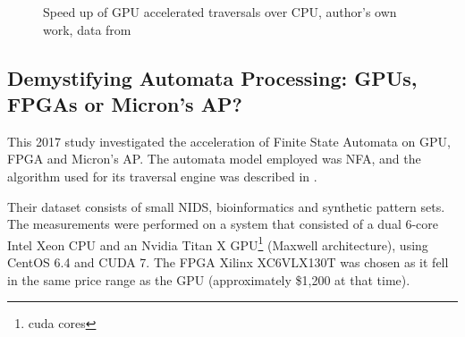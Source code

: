 \documentclass[10pt,onecolumn,twoside,english,a4paper]{article}
\begin{document}
\begin{figure}[h!]
  \centering
  \caption{Speed up of GPU accelerated traversals over CPU, author's own work, data from \cite{Becchi:regex_large_dataset}}
  \label{speedup:becchi}
\end{figure}

\subsection{Demystifying Automata Processing: GPUs, FPGAs or Micron's AP?} \label{Nourian:DemystifyingFSA_analysis}
This 2017 study\cite{Nourian:DemystifyingFSA} investigated the acceleration of Finite State Automata on GPU, FPGA and Micron's AP. The automata model employed was NFA, and the algorithm used for its traversal engine was described in \cite{van2012designing}.

Their dataset consists of small NIDS, bioinformatics and synthetic pattern sets.
The measurements were performed on a system that consisted of a dual 6-core Intel Xeon CPU and an Nvidia Titan X GPU\footnote{cuda cores} (Maxwell architecture), using CentOS 6.4 and CUDA 7. The FPGA Xilinx XC6VLX130T was chosen as it fell in the same price range as the GPU (approximately \$1,200 at that time).
\end{document}
